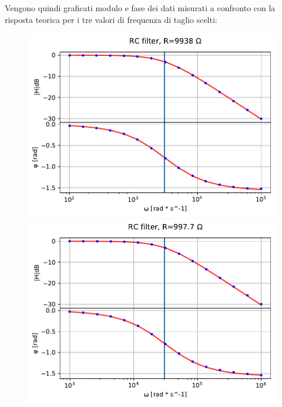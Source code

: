 \documentclass{article}
\begin{document}
Vengono quindi graficati modulo e fase dei dati misurati a confronto con la risposta teorica per i tre valori di frequenza di taglio scelti:

\begin{figure}[H]
    \centering
    \begin{minipage}{0.5\textwidth}
        \centering
        \includegraphics[width=\textwidth]{bodeplot1.pdf} 
    \end{minipage}\hfill
    \begin{minipage}{0.5\textwidth}
        \centering
        \includegraphics[width=\textwidth]{bodeplot2.pdf} 
    \end{minipage}
    \\

\end{figure}
\end{document}

